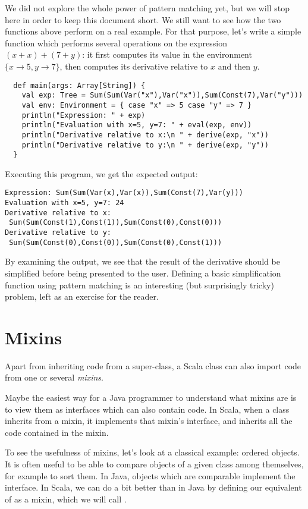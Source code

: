 \documentclass[a4paper,12pt,twoside,titlepage]{article}
\newcommand{\langname}[1]{#1\xspace}
\newcommand{\Scala}{\langname{Scala}}
\newcommand{\Java}{\langname{Java}}
\begin{document}
We did not explore the whole power of pattern matching yet, but we
will stop here in order to keep this document short. We still want to
see how the two functions above perform on a real example. For that
purpose, let's write a simple  function which performs
several operations on the expression $(x+x)+(7+y)$: it first computes
its value in the environment $\{x\rightarrow 5, y\rightarrow 7\}$, then
computes its derivative relative to $x$ and then $y$.
\begin{lstlisting}
  def main(args: Array[String]) {
    val exp: Tree = Sum(Sum(Var("x"),Var("x")),Sum(Const(7),Var("y")))
    val env: Environment = { case "x" => 5 case "y" => 7 }
    println("Expression: " + exp)
    println("Evaluation with x=5, y=7: " + eval(exp, env))
    println("Derivative relative to x:\n " + derive(exp, "x"))
    println("Derivative relative to y:\n " + derive(exp, "y"))
  }
\end{lstlisting}
Executing this program, we get the expected output:
\begin{verbatim}
Expression: Sum(Sum(Var(x),Var(x)),Sum(Const(7),Var(y)))
Evaluation with x=5, y=7: 24
Derivative relative to x:
 Sum(Sum(Const(1),Const(1)),Sum(Const(0),Const(0)))
Derivative relative to y:
 Sum(Sum(Const(0),Const(0)),Sum(Const(0),Const(1)))
\end{verbatim}
By examining the output, we see that the result of the derivative
should be simplified before being presented to the user. Defining a
basic simplification function using pattern matching is an interesting
(but surprisingly tricky) problem, left as an exercise for the reader.

\section{Mixins}\label{sec:mixins}

Apart from inheriting code from a super-class, a \Scala class can also
import code from one or several \emph{mixins}.

Maybe the easiest way for a \Java programmer to understand what mixins
are is to view them as interfaces which can also contain code. In
\Scala, when a class inherits from a mixin, it implements that mixin's
interface, and inherits all the code contained in the mixin.

To see the usefulness of mixins, let's look at a classical example:
ordered objects. It is often useful to be able to compare objects of a
given class among themselves, for example to sort them. In \Java,
objects which are comparable implement the 
interface. In \Scala, we can do a bit better than in \Java by defining
our equivalent of  as a mixin, which we will call
.
\end{document}
